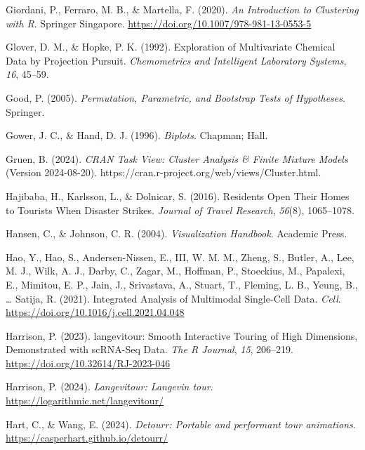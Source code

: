\documentclass[
  letterpaper,
]{krantz}
\newlength{\cslhangindent}
\newenvironment{CSLReferences}[2] %
 {\begin{list}{}{%
  \setlength{\itemindent}{0pt}
  \setlength{\leftmargin}{0pt}
  \setlength{\parsep}{0pt}
  \ifodd #1
   \setlength{\leftmargin}{\cslhangindent}
   \setlength{\itemindent}{-1\cslhangindent}
  \fi
  \setlength{\itemsep}{#2\baselineskip}}}
 {\end{list}}
\begin{document}
\begin{CSLReferences}{1}{0}
Giordani, P., Ferraro, M. B., \& Martella, F. (2020). \emph{An
{I}ntroduction to {C}lustering with {R}}. Springer Singapore.
\url{https://doi.org/10.1007/978-981-13-0553-5}

Glover, D. M., \& Hopke, P. K. (1992). {E}xploration of {M}ultivariate
{C}hemical {D}ata by {P}rojection {P}ursuit. \emph{Chemometrics and
Intelligent Laboratory Systems}, \emph{16}, 45--59.

Good, P. (2005). \emph{Permutation, {P}arametric, and {B}ootstrap
{T}ests of {H}ypotheses}. Springer.

Gower, J. C., \& Hand, D. J. (1996). \emph{Biplots}. Chapman; Hall.

Gruen, B. (2024). \emph{CRAN {T}ask {V}iew: {C}luster {A}nalysis \&
{F}inite {M}ixture {M}odels} (Version 2024-08-20).
https://cran.r-project.org/web/views/Cluster.html.

Hajibaba, H., Karlsson, L., \& Dolnicar, S. (2016). Residents {O}pen
{T}heir {H}omes to {T}ourists {W}hen {D}isaster {S}trikes. \emph{Journal
of Travel Research}, \emph{56}(8), 1065--1078.

Hansen, C., \& Johnson, C. R. (2004). \emph{Visualization {H}andbook}.
Academic Press.

Hao, Y., Hao, S., Andersen-Nissen, E., III, W. M. M., Zheng, S., Butler,
A., Lee, M. J., Wilk, A. J., Darby, C., Zagar, M., Hoffman, P.,
Stoeckius, M., Papalexi, E., Mimitou, E. P., Jain, J., Srivastava, A.,
Stuart, T., Fleming, L. B., Yeung, B., \ldots{} Satija, R. (2021).
Integrated {A}nalysis of {M}ultimodal {S}ingle-{C}ell {D}ata.
\emph{Cell}. \url{https://doi.org/10.1016/j.cell.2021.04.048}

Harrison, P. (2023). {langevitour}: {S}mooth {I}nteractive {T}ouring of
{H}igh {D}imensions, {D}emonstrated with {scRNA-Seq} {D}ata. \emph{The R
Journal}, \emph{15}, 206--219.
\url{https://doi.org/10.32614/RJ-2023-046}

Harrison, P. (2024). \emph{Langevitour: Langevin tour}.
\url{https://logarithmic.net/langevitour/}

Hart, C., \& Wang, E. (2024). \emph{Detourr: Portable and performant
tour animations}. \url{https://casperhart.github.io/detourr/}


\end{CSLReferences}
\end{document}
